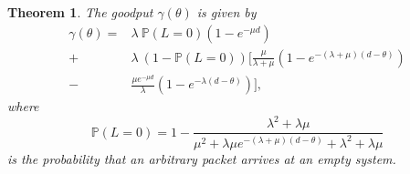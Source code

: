 \documentclass[preprint,12pt]{elsarticle}
\newtheorem{thm}{Theorem}
\theoremstyle{definition}
\theoremstyle{plain}
\theoremstyle{remark}
\renewcommand{\P}{\ensuremath{\mathbb{P}}}
\newcommand{\e}{e}
\begin{document}
\begin{thm} \label{theoremForReneging}
  The goodput $\gamma(\theta)$ is given by
  \begin{equation}\label{eq: gamma}
   \begin{split}
    \gamma(\theta) =& \lambda\: \P(L=0)(1-\e^{-\mu d}) \\
      +&\lambda\:(1-\P(L=0))
            \Big[\frac{\mu}{\lambda+\mu}\left(1-\e^{-(\lambda+\mu)(d-\theta)}\right) \\
            -& \frac{\mu \e^{-\mu d}}{\lambda}\left(1-\e^{-\lambda(d-\theta)}\right)
            \Big],
              \end{split}
  \end{equation}
  where
  \begin{equation}\label{eq: P(L=0)}
    \P(L=0) = 1 - \frac{\lambda^2 + \lambda \mu}{\mu^2 + \lambda \mu \e^{-(\lambda+\mu)(d-\theta)} + \lambda^2 + \lambda \mu}
  \end{equation}
  is the probability that an arbitrary packet arrives at an empty system.
\end{thm}
\end{document}

